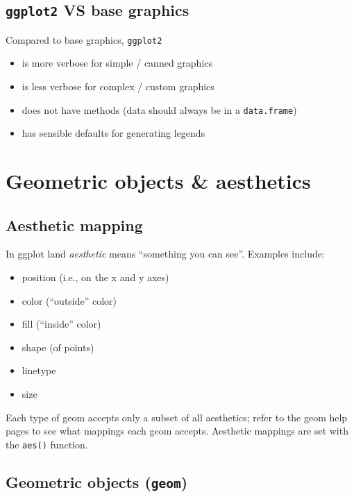 \documentclass[
]{book}
\providecommand{\tightlist}{%
  \setlength{\itemsep}{0pt}\setlength{\parskip}{0pt}}
\begin{document}
\hypertarget{ggplot2-vs-base-graphics}{%
\subsection{\texorpdfstring{\texttt{ggplot2} VS base graphics}{ggplot2 VS base graphics}}\label{ggplot2-vs-base-graphics}}

Compared to base graphics, \texttt{ggplot2}

\begin{itemize}
\tightlist
\item
  is more verbose for simple / canned graphics
\item
  is less verbose for complex / custom graphics
\item
  does not have methods (data should always be in a \texttt{data.frame})
\item
  has sensible defaults for generating legends
\end{itemize}

\hypertarget{geometric-objects-aesthetics}{%
\section{Geometric objects \& aesthetics}\label{geometric-objects-aesthetics}}

\hypertarget{aesthetic-mapping}{%
\subsection{Aesthetic mapping}\label{aesthetic-mapping}}

In ggplot land \emph{aesthetic} means ``something you can see''. Examples include:

\begin{itemize}
\tightlist
\item
  position (i.e., on the x and y axes)
\item
  color (``outside'' color)
\item
  fill (``inside'' color)
\item
  shape (of points)
\item
  linetype
\item
  size
\end{itemize}

Each type of geom accepts only a subset of all aesthetics; refer to the geom help pages to see what mappings each geom accepts. Aesthetic mappings are set with the \texttt{aes()} function.

\hypertarget{geometric-objects-geom}{%
\subsection{\texorpdfstring{Geometric objects (\texttt{geom})}{Geometric objects (geom)}}\label{geometric-objects-geom}}
\end{document}
